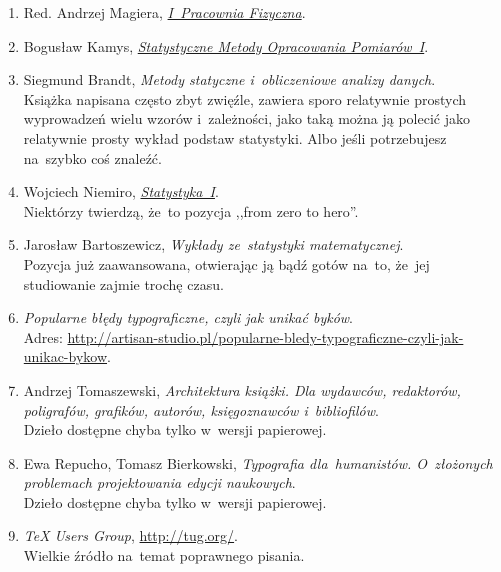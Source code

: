 \documentclass[a4paper,11pt]{article}
\begin{document}
\begin{enumerate}
\item Red. Andrzej Magiera,
  \href{http://www.1pf.if.uj.edu.pl/documents/5046939/5227638/skrypt.pdf}{\emph{I~Pracownia
      Fizyczna}}.

\item Bogusław Kamys,
  \href{http://users.uj.edu.pl/\~ufkamys/BK/smop1N\_h.pdf}{\emph{Statystyczne
      Metody Opracowania Pomiarów~I}}.

\item Siegmund Brandt, \emph{Metody statyczne i~obliczeniowe analizy
    danych}. \\
  Książka napisana często zbyt zwięźle, zawiera sporo relatywnie
  prostych wyprowadzeń wielu wzorów i~zależności, jako taką można ją
  polecić jako relatywnie prosty wykład podstaw statystyki. Albo jeśli
  potrzebujesz na~szybko coś znaleźć.

\item Wojciech Niemiro, \href{https://www.mimuw.edu.pl/~pokar/StatystykaI/Literatura/NiemiroBook.pdf}{\emph{Statystyka~I}}. \\
  Niektórzy twierdzą, że~to pozycja ,,from zero to hero''.

\item Jarosław Bartoszewicz, \emph{Wykłady ze~statystyki matematycznej}. \\
  Pozycja już zaawansowana, otwierając ją bądź gotów na~to, że~jej
  studiowanie zajmie trochę czasu.

\item \emph{Popularne
    błędy typograficzne, czyli jak unikać byków}. \\
  Adres:
  \href{http://artisan-studio.pl/popularne-bledy-typograficzne-czyli-jak-unikac-bykow}{http://artisan-studio.pl/popularne-bledy-typograficzne-czyli-jak-unikac-bykow}.

\item Andrzej Tomaszewski, \emph{Architektura książki. Dla wydawców,
    redaktorów, poligrafów, grafików, autorów, księgoznawców
    i~bibliofilów}. \\
  Dzieło dostępne chyba tylko w~wersji papierowej.

\item Ewa Repucho, Tomasz Bierkowski, \emph{Typografia dla~humanistów.
    O~złożonych problemach projektowania edycji naukowych}. \\
  Dzieło dostępne chyba tylko w~wersji papierowej.

\item \emph{\TeX{} Users Group},
  \href{http://tug.org/}{http://tug.org/}. \\
  Wielkie źródło na~temat poprawnego pisania.


\end{enumerate}
\end{document}
